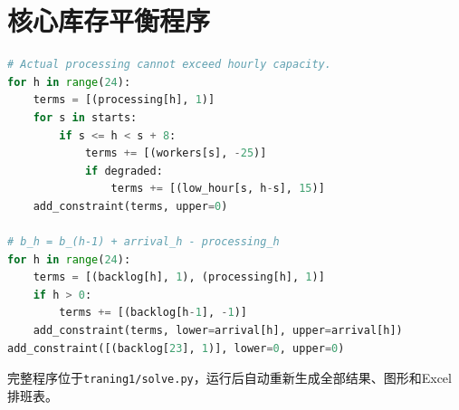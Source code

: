 \section{核心库存平衡程序}

\begin{lstlisting}[language=python]
# Actual processing cannot exceed hourly capacity.
for h in range(24):
    terms = [(processing[h], 1)]
    for s in starts:
        if s <= h < s + 8:
            terms += [(workers[s], -25)]
            if degraded:
                terms += [(low_hour[s, h-s], 15)]
    add_constraint(terms, upper=0)

# b_h = b_(h-1) + arrival_h - processing_h
for h in range(24):
    terms = [(backlog[h], 1), (processing[h], 1)]
    if h > 0:
        terms += [(backlog[h-1], -1)]
    add_constraint(terms, lower=arrival[h], upper=arrival[h])
add_constraint([(backlog[23], 1)], lower=0, upper=0)
\end{lstlisting}

完整程序位于\texttt{traning1/solve.py}，运行后自动重新生成全部结果、图形和Excel排班表。
